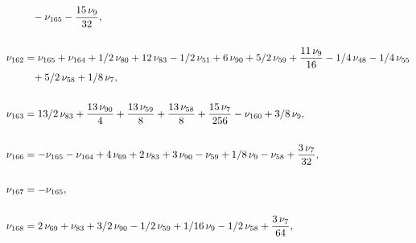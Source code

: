 \documentclass[a4paper,12pt, DIV=14, BCOR=5mm, twoside, headsepline, numbers=noenddot]{scrbook}
\begin{document}
\begin{align}
\begin{aligned}
 &\hphantom{=}-\nu_{{165}
}-{\frac {15\,\nu_{{9}}}{32}}, \\
\\
\nu_{{162}}&=\nu_{{165}}+\nu_{{164}}+1/2
\,\nu_{{80}}+12\,\nu_{{83}}-1/2\,\nu_{{51}}+6\,\nu_{{90}}+5/2\,\nu_{{
59}}+{\frac {11\,\nu_{{9}}}{16}}-1/4\,\nu_{{48}}-1/4\,\nu_{{55}}\\
 &\hphantom{=}+5/2\,
\nu_{{58}}+1/8\,\nu_{{7}}, \\
\\
\nu_{{163}}&=13/2\,\nu_{{83}}+{\frac {13\,\nu
_{{90}}}{4}}+{\frac {13\,\nu_{{59}}}{8}}+{\frac {13\,\nu_{{58}}}{8}}+{
\frac {15\,\nu_{{7}}}{256}}-\nu_{{160}}+3/8\,\nu_{{9}}, \\
\\
\nu_{{166}}&=-
\nu_{{165}}-\nu_{{164}}+4\,\nu_{{69}}+2\,\nu_{{83}}+3\,\nu_{{90}}-\nu_
{{59}}+1/8\,\nu_{{9}}-\nu_{{58}}+{\frac {3\,\nu_{{7}}}{32}}, \\
\\
\nu_{{167}
}&=-\nu_{{165}}, \\
\\
\nu_{{168}}&=2\,\nu_{{69}}+\nu_{{83}}+3/2\,\nu_{{90}}-1/
2\,\nu_{{59}}+1/16\,\nu_{{9}}-1/2\,\nu_{{58}}+{\frac {3\,\nu_{{7}}}{64
}}, 
\end{aligned}
\end{align}
\end{document}
